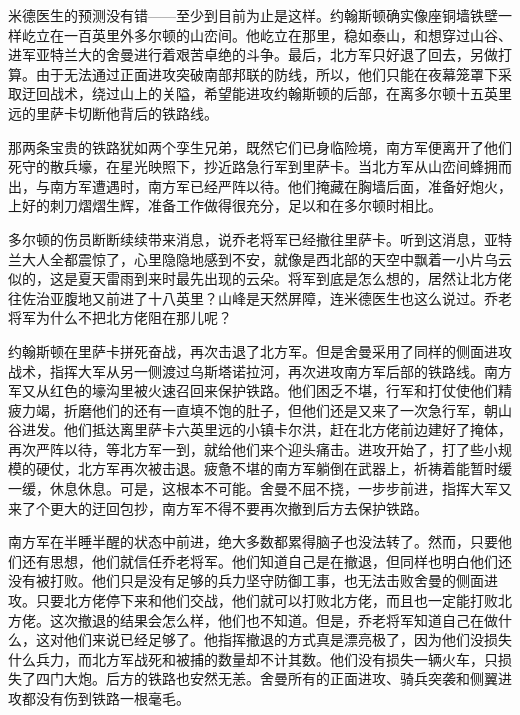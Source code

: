 \par 米德医生的预测没有错——至少到目前为止是这样。约翰斯顿确实像座铜墙铁壁一样屹立在一百英里外多尔顿的山峦间。他屹立在那里，稳如泰山，和想穿过山谷、进军亚特兰大的舍曼进行着艰苦卓绝的斗争。最后，北方军只好退了回去，另做打算。由于无法通过正面进攻突破南部邦联的防线，所以，他们只能在夜幕笼罩下采取迂回战术，绕过山上的关隘，希望能进攻约翰斯顿的后部，在离多尔顿十五英里远的里萨卡切断他背后的铁路线。
\par 那两条宝贵的铁路犹如两个孪生兄弟，既然它们已身临险境，南方军便离开了他们死守的散兵壕，在星光映照下，抄近路急行军到里萨卡。当北方军从山峦间蜂拥而出，与南方军遭遇时，南方军已经严阵以待。他们掩藏在胸墙后面，准备好炮火，上好的刺刀熠熠生辉，准备工作做得很充分，足以和在多尔顿时相比。
\par 多尔顿的伤员断断续续带来消息，说乔老将军已经撤往里萨卡。听到这消息，亚特兰大人全都震惊了，心里隐隐地感到不安，就像是西北部的天空中飘着一小片乌云似的，这是夏天雷雨到来时最先出现的云朵。将军到底是怎么想的，居然让北方佬往佐治亚腹地又前进了十八英里？山峰是天然屏障，连米德医生也这么说过。乔老将军为什么不把北方佬阻在那儿呢？
\par 约翰斯顿在里萨卡拼死奋战，再次击退了北方军。但是舍曼采用了同样的侧面进攻战术，指挥大军从另一侧渡过乌斯塔诺拉河，再次进攻南方军后部的铁路线。南方军又从红色的壕沟里被火速召回来保护铁路。他们困乏不堪，行军和打仗使他们精疲力竭，折磨他们的还有一直填不饱的肚子，但他们还是又来了一次急行军，朝山谷进发。他们抵达离里萨卡六英里远的小镇卡尔洪，赶在北方佬前边建好了掩体，再次严阵以待，等北方军一到，就给他们来个迎头痛击。进攻开始了，打了些小规模的硬仗，北方军再次被击退。疲惫不堪的南方军躺倒在武器上，祈祷着能暂时缓一缓，休息休息。可是，这根本不可能。舍曼不屈不挠，一步步前进，指挥大军又来了个更大的迂回包抄，南方军不得不要再次撤到后方去保护铁路。
\par 南方军在半睡半醒的状态中前进，绝大多数都累得脑子也没法转了。然而，只要他们还有思想，他们就信任乔老将军。他们知道自己是在撤退，但同样也明白他们还没有被打败。他们只是没有足够的兵力坚守防御工事，也无法击败舍曼的侧面进攻。只要北方佬停下来和他们交战，他们就可以打败北方佬，而且也一定能打败北方佬。这次撤退的结果会怎么样，他们也不知道。但是，乔老将军知道自己在做什么，这对他们来说已经足够了。他指挥撤退的方式真是漂亮极了，因为他们没损失什么兵力，而北方军战死和被捕的数量却不计其数。他们没有损失一辆火车，只损失了四门大炮。后方的铁路也安然无恙。舍曼所有的正面进攻、骑兵突袭和侧翼进攻都没有伤到铁路一根毫毛。
